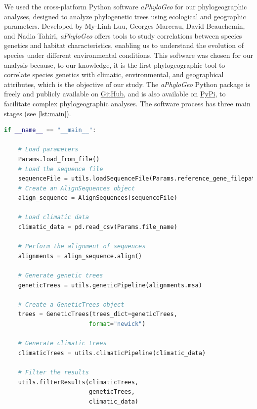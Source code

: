 We used the cross-platform Python software \textit{aPhyloGeo} for our phylogeographic analyses, designed to analyze phylogenetic trees using ecological and geographic parameters. Developed by My-Linh Luu, Georges Marceau, David Beauchemin, and Nadia Tahiri, \textit{aPhyloGeo} offers tools to study correlations between species genetics and habitat characteristics, enabling us to understand the evolution of species under different environmental conditions. This software was chosen for our analysis because, to our knowledge, it is the first phylogeographic tool to correlate species genetics with climatic, environmental, and geographical attributes, which is the objective of our study. The \textit{aPhyloGeo} Python package is freely and publicly available on \href{https://github.com/tahiri-lab/aPhyloGeo}{GitHub}, and is also available on \href{https://pypi.org/project/aphylogeo/}{PyPi}, to facilitate complex phylogeographic analyses. The software process has three main stages (see \autoref{lst:main}).

\begin{lstlisting}[label=lst:main,language=Python,caption=Main script for tutorial using the aPhyloGeo package.]
if __name__ == "__main__":

    # Load parameters
    Params.load_from_file()
    # Load the sequence file
    sequenceFile = utils.loadSequenceFile(Params.reference_gene_filepath)
    # Create an AlignSequences object
    align_sequence = AlignSequences(sequenceFile)

    # Load climatic data 
    climatic_data = pd.read_csv(Params.file_name)

    # Perform the alignment of sequences
    alignments = align_sequence.align()

    # Generate genetic trees
    geneticTrees = utils.geneticPipeline(alignments.msa)
    
    # Create a GeneticTrees object
    trees = GeneticTrees(trees_dict=geneticTrees, 
                        format="newick")
   
    # Generate climatic trees
    climaticTrees = utils.climaticPipeline(climatic_data)
    
    # Filter the results
    utils.filterResults(climaticTrees, 
                        geneticTrees, 
                        climatic_data)

\end{lstlisting}

